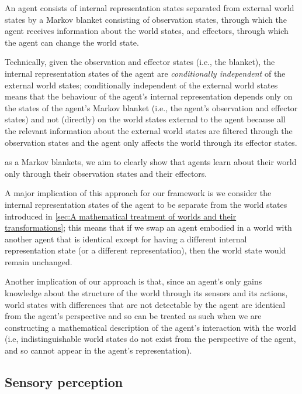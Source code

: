\begin{postulate}
	An agent consists of internal representation states separated from external world states by a Markov blanket consisting of observation states, through which the agent receives information about the world states, and effectors, through which the agent can change the world state.
\end{postulate}

Technically, given the observation and effector states (i.e., the blanket), the internal representation states of the agent are \emph{conditionally independent} of the external world states; conditionally independent of the external world states means that the behaviour of the agent's internal representation depends only on the states of the agent's Markov blanket (i.e., the agent's observation and effector states) and not (directly) on the world states external to the agent because all the relevant information about the external world states are filtered through the observation states and the agent only affects the world through its effector states.

 as a Markov blankets, we aim to clearly show that agents learn about their world only through their observation states and their effectors.

A major implication of this approach for our framework is we consider the internal representation states of the agent to be separate from the world states introduced in \cref{sec:A mathematical treatment of worlds and their transformations}; this means that if we swap an agent embodied in a world with another agent that is identical except for having a different internal representation state (or a different representation), then the world state would remain unchanged.

Another implication of our approach is that, since an agent's only gains knowledge about the structure of the world through its sensors and its actions, world states with differences that are not detectable by the agent are identical from the agent's perspective and so can be treated as such when we are constructing a mathematical description of the agent's interaction with the world (i.e, indistinguishable world states do not exist from the perspective of the agent, and so cannot appear in the agent's representation).


\subsection{Sensory perception}

